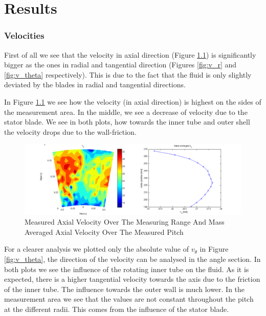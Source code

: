 \chapter{Results}\label{sec:results}

\subsection{Velocities}

First of all we see that the velocity in axial direction (Figure \ref{fig:v_x}) is significantly bigger as the ones in radial and tangential direction (Figures \ref{fig:v_r} and \ref{fig:v_theta} respectively). This is due to the fact that the fluid is only slightly deviated by the blades in radial and tangential directions. 

In Figure \ref{fig:v_x} we see how the velocity (in axial direction) is highest on the sides of the measurement area. In the middle, we see a decrease of velocity due to the stator blade. We see in both plots, how towards the inner tube and outer shell the velocity drops due to the wall-friction.\\



\begin{figure}[H]
\centering
\includegraphics[trim = 110px 0px 80px 0px, clip = true,width=\textwidth]{pics/vx.png}
\caption{Measured Axial Velocity Over The Measuring Range And Mass Averaged Axial Velocity Over The Measured Pitch}
\label{fig:v_x}
\end{figure}
For a clearer analysis we plotted only the absolute value of $v_\theta$ in Figure \ref{fig:v_theta}, the direction of the velocity can be analysed in the angle section. In both plots we see the influence of the rotating inner tube on the fluid. As it is expected, there is a higher tangential velocity towards the axis due to the friction of the inner tube. The influence towards the outer wall is much lower. In the measurement area we see that the values are not constant throughout the pitch at the different radii. This comes from the influence of the stator blade.



